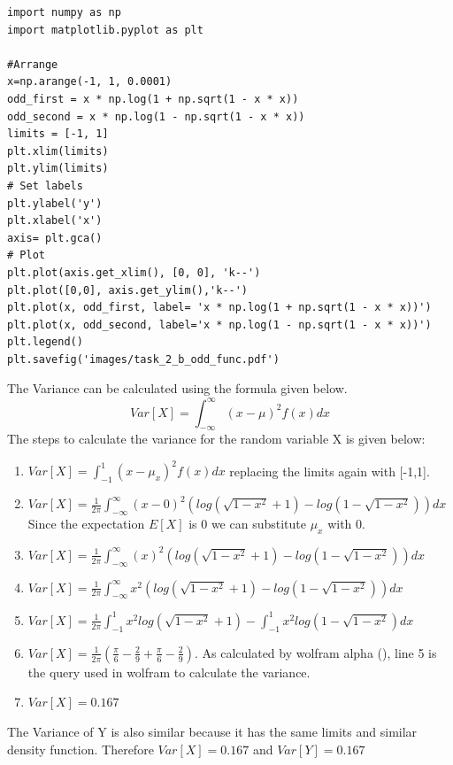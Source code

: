 \begin{lstlisting}[caption={Code Task 2 b},label={lst:code_task_2_b}]
import numpy as np
import matplotlib.pyplot as plt

#Arrange
x=np.arange(-1, 1, 0.0001)
odd_first = x * np.log(1 + np.sqrt(1 - x * x))
odd_second = x * np.log(1 - np.sqrt(1 - x * x))
limits = [-1, 1]
plt.xlim(limits)
plt.ylim(limits)
# Set labels
plt.ylabel('y')
plt.xlabel('x')
axis= plt.gca()
# Plot
plt.plot(axis.get_xlim(), [0, 0], 'k--')
plt.plot([0,0], axis.get_ylim(),'k--')
plt.plot(x, odd_first, label= 'x * np.log(1 + np.sqrt(1 - x * x))')
plt.plot(x, odd_second, label='x * np.log(1 - np.sqrt(1 - x * x))')
plt.legend()
plt.savefig('images/task_2_b_odd_func.pdf')
\end{lstlisting}
\newpage The Variance can be calculated using the formula given below.
\begin{equation}
    Var[X]=\int_{-\infty}^{\infty}(x-\mu)^2f(x) dx
\end{equation}
The steps to calculate the variance for the random variable X is given below:
\begin{enumerate}
    \item $Var[X]=\int_{-1}^{1}(x-\mu_x)^2f(x) dx$ replacing the limits again with [-1,1].
    \item $Var[X]= \frac{1}{2\pi} \int_{-\infty}^{\infty}(x-0)^2  (log(\sqrt{1-x^2}+1)- log(1-\sqrt{1-x^2}))dx$ Since the expectation $E[X]$ is 0 we can substitute $\mu_x$ with 0.
    \item $Var[X]= \frac{1}{2\pi} \int_{-\infty}^{\infty}(x)^2  (log(\sqrt{1-x^2}+1)- log(1-\sqrt{1-x^2}))dx$
    \item $Var[X]= \frac{1}{2\pi} \int_{-\infty}^{\infty}x^2  (log(\sqrt{1-x^2}+1)- log(1-\sqrt{1-x^2}))dx$
    \item $Var[X]= \frac{1}{2\pi} \int_{-1}^{1}x^2log(\sqrt{1-x^2}+1)- \int_{-1}^{1} x^2log(1-\sqrt{1-x^2})dx$
    \item $Var[X]=\frac{1}{2\pi}(\frac{\pi}{6}-\frac{2}{9}+\frac{\pi}{6}-\frac{2}{9})$. As calculated by wolfram alpha (\cite{wolfram}), line 5 is the query used in wolfram to calculate the variance.
     \item $Var[X]=0.167$
\end{enumerate}
The Variance of Y is also similar because it has the same limits and similar density function. Therefore $Var[X] = 0.167$ and $Var[Y] = 0.167$